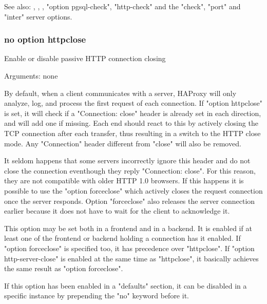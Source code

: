 See also: , , ,
             "option pgsql-check", "http-check" and the "check", "port" and
             "inter" server options.

\subsubsection[httpclose]{}
\subsubsection*{no option httpclose}


  Enable or disable passive HTTP connection closing


  Arguments: none

  By default, when a client communicates with a server, HAProxy will only
  analyze, log, and process the first request of each connection. If "option
  httpclose" is set, it will check if a "Connection: close" header is already
  set in each direction, and will add one if missing. Each end should react to
  this by actively closing the TCP connection after each transfer, thus
  resulting in a switch to the HTTP close mode. Any "Connection" header
  different from "close" will also be removed.

  It seldom happens that some servers incorrectly ignore this header and do not
  close the connection eventhough they reply "Connection: close". For this
  reason, they are not compatible with older HTTP 1.0 browsers. If this happens
  it is possible to use the "option forceclose" which actively closes the
  request connection once the server responds. Option "forceclose" also
  releases the server connection earlier because it does not have to wait for
  the client to acknowledge it.

  This option may be set both in a frontend and in a backend. It is enabled if
  at least one of the frontend or backend holding a connection has it enabled.
  If "option forceclose" is specified too, it has precedence over "httpclose".
  If "option http-server-close" is enabled at the same time as "httpclose", it
  basically achieves the same result as "option forceclose".

  If this option has been enabled in a "defaults" section, it can be disabled
  in a specific instance by prepending the "no" keyword before it.



